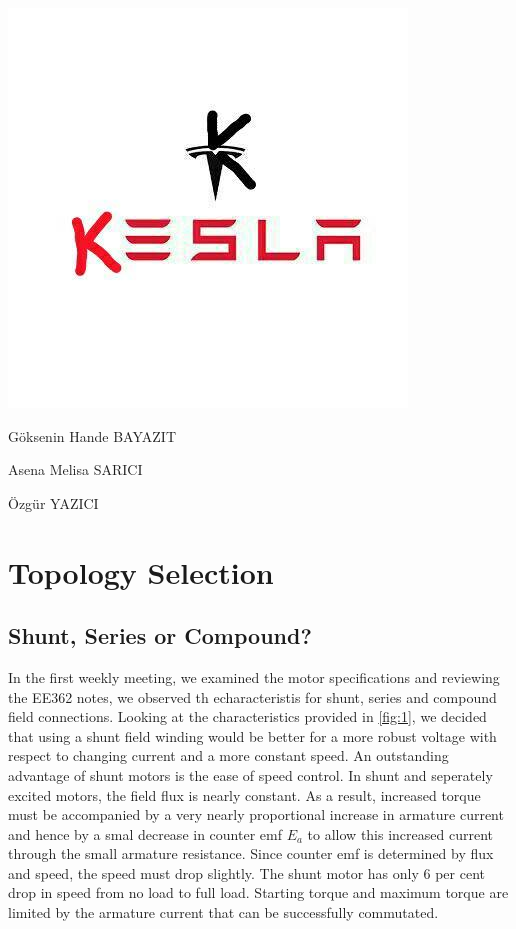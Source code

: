 \documentclass[10pt,a4paper]{article}
\begin{document}
\begin{titlepage}
\centering


\includegraphics[scale=0.8]{kesla.PNG} \par

\LARGE
\vspace{2cm}
{Göksenin Hande BAYAZIT\par Asena Melisa SARICI\par Özgür YAZICI}


\end{titlepage}

\newpage

\section*{Topology Selection}

\subsection*{Shunt, Series or Compound?}
In the first weekly meeting, we examined the motor specifications and reviewing the EE362 notes, we observed th echaracteristis for shunt, series and compound field connections. Looking at the characteristics provided in \ref{fig:1}, we decided that using a shunt field winding would be better for a more robust voltage with respect to changing current and a more constant speed.  An outstanding advantage of shunt motors is the ease of speed control.  In shunt and seperately excited motors, the field flux is nearly constant. As a result, increased torque must be accompanied by a very nearly proportional increase in armature current and hence by a smal decrease in counter emf $E_{a}$ to allow this increased current through the small armature resistance.  Since counter emf is determined by flux and speed, the speed must drop slightly. The shunt motor has only 6 per cent drop in speed from no load to full load. Starting torque and maximum torque are limited by the armature current that can be successfully commutated.
\end{document}
